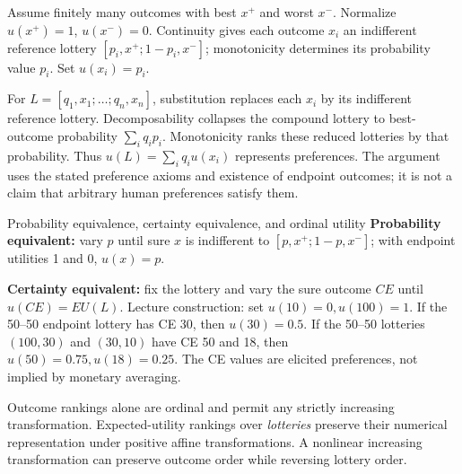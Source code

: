 \documentclass[10pt,a4paper]{article}
\begin{document}
\begin{prf}
Assume finitely many outcomes with best $x^+$ and worst $x^-$. Normalize $u(x^+)=1$, $u(x^-)=0$. Continuity gives each outcome $x_i$ an indifferent reference lottery $[p_i,x^+;1-p_i,x^-]$; monotonicity determines its probability value $p_i$. Set $u(x_i)=p_i$.

For $L=[q_1,x_1;\ldots;q_n,x_n]$, substitution replaces each $x_i$ by its indifferent reference lottery. Decomposability collapses the compound lottery to best-outcome probability $\sum_iq_ip_i$. Monotonicity ranks these reduced lotteries by that probability. Thus $u(L)=\sum_iq_iu(x_i)$ represents preferences. The argument uses the stated preference axioms and existence of endpoint outcomes; it is not a claim that arbitrary human preferences satisfy them.
\end{prf}

\begin{card}{Probability equivalence, certainty equivalence, and ordinal utility}
\textbf{Probability equivalent:} vary $p$ until sure $x$ is indifferent to $[p,x^+;1-p,x^-]$; with endpoint utilities 1 and 0, $u(x)=p$.

\textbf{Certainty equivalent:} fix the lottery and vary the sure outcome $CE$ until $u(CE)=EU(L)$. Lecture construction: set $u(10)=0,u(100)=1$. If the 50--50 endpoint lottery has CE 30, then $u(30)=0.5$. If the 50--50 lotteries $(100,30)$ and $(30,10)$ have CE 50 and 18, then $u(50)=0.75,u(18)=0.25$. The CE values are elicited preferences, not implied by monetary averaging.

Outcome rankings alone are ordinal and permit any strictly increasing transformation. Expected-utility rankings over \emph{lotteries} preserve their numerical representation under positive affine transformations. A nonlinear increasing transformation can preserve outcome order while reversing lottery order.
\end{card}
\end{document}
